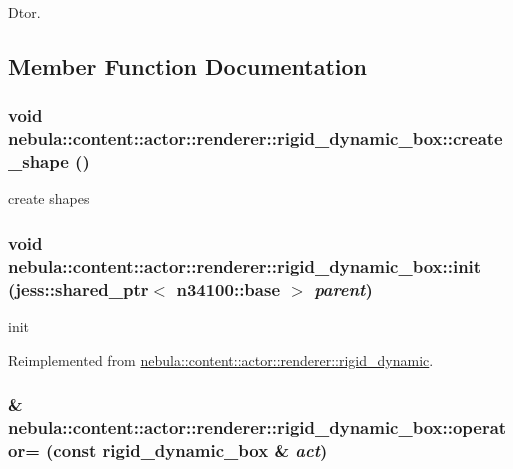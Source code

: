 Dtor. 

\subsection{Member Function Documentation}
\hypertarget{classnebula_1_1content_1_1actor_1_1renderer_1_1rigid__dynamic__box_a0461e5beff11b0749612523b2f8142b6}{
\subsubsection[{create\_\-shape}]{\setlength{\rightskip}{0pt plus 5cm}void nebula::content::actor::renderer::rigid\_\-dynamic\_\-box::create\_\-shape ()}}
\label{classnebula_1_1content_1_1actor_1_1renderer_1_1rigid__dynamic__box_a0461e5beff11b0749612523b2f8142b6}


create shapes \hypertarget{classnebula_1_1content_1_1actor_1_1renderer_1_1rigid__dynamic__box_a73d0f162b01df6a9f025d51477d37789}{
\subsubsection[{init}]{\setlength{\rightskip}{0pt plus 5cm}void nebula::content::actor::renderer::rigid\_\-dynamic\_\-box::init (jess::shared\_\-ptr$<$ {\bf n34100::base} $>$ {\em parent})}}
\label{classnebula_1_1content_1_1actor_1_1renderer_1_1rigid__dynamic__box_a73d0f162b01df6a9f025d51477d37789}


init 

Reimplemented from \hyperlink{classnebula_1_1content_1_1actor_1_1renderer_1_1rigid__dynamic_ab957f8a465493d2a9d7a2f0015d4a5ea}{nebula::content::actor::renderer::rigid\_\-dynamic}.\hypertarget{classnebula_1_1content_1_1actor_1_1renderer_1_1rigid__dynamic__box_a26efbc775da4307f9294dab260b43723}{
\subsubsection[{operator=}]{ \& nebula::content::actor::renderer::rigid\_\-dynamic\_\-box::operator= (const {\bf rigid\_\-dynamic\_\-box} \& {\em act})}}
\label{classnebula_1_1content_1_1actor_1_1renderer_1_1rigid__dynamic__box_a26efbc775da4307f9294dab260b43723}


